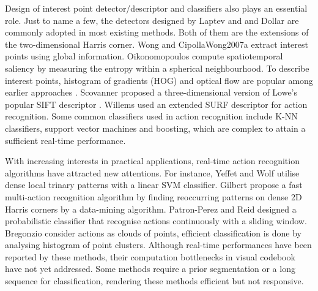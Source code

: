 Design of interest point detector/descriptor and classifiers also plays an essential role. 
Just to name a few, the detectors designed by Laptev and \cite{Laptev2005} and Dollar \etal \cite{Dollar2005} are commonly adopted in most existing methods. Both of them are the extensions of the two-dimensional Harris corner.
Wong and Cipolla{Wong2007a} extract interest points using global information.
Oikonomopoulos  compute spatiotemporal saliency by measuring the entropy within a spherical neighbourhood.
To describe interest points, histogram of gradients (HOG) and optical flow are popular among earlier approaches \cite{Dollar2005, Niebles2008, Schuldt2004}. Scovanner \etal \cite{Scovanner2007} proposed a three-dimensional version of Lowe's popular SIFT descriptor \cite{Lowe2004}. Willems \etal \cite{Willems2009} used an extended SURF descriptor for action recognition.
Some common classifiers used in action recognition include K-NN classifiers, support vector machines and boosting, which are complex to attain a sufficient real-time performance.

With increasing interests in practical applications, real-time action recognition algorithms have attracted new attentions. For instance, Yeffet and Wolf \cite{Yeffet2009} utilise dense local trinary patterns with a linear SVM classifier. Gilbert \etal \cite{Gilbert2009} propose a fast multi-action recognition algorithm by finding reoccurring patterns on dense 2D Harris corners by a data-mining algorithm.
Patron-Perez and Reid \cite{Patron2007} designed a probabilistic classifier that recognise actions continuously with a sliding window. 
Bregonzio \etal \cite{Bregonzio2009} consider actions as clouds of points, efficient classification is done by analysing histogram of point clusters. Although real-time performances have been reported by these methods, their computation bottlenecks in visual codebook have not yet addressed. 
Some methods require a prior segmentation or a long sequence for classification, rendering these methods efficient but not responsive. 

